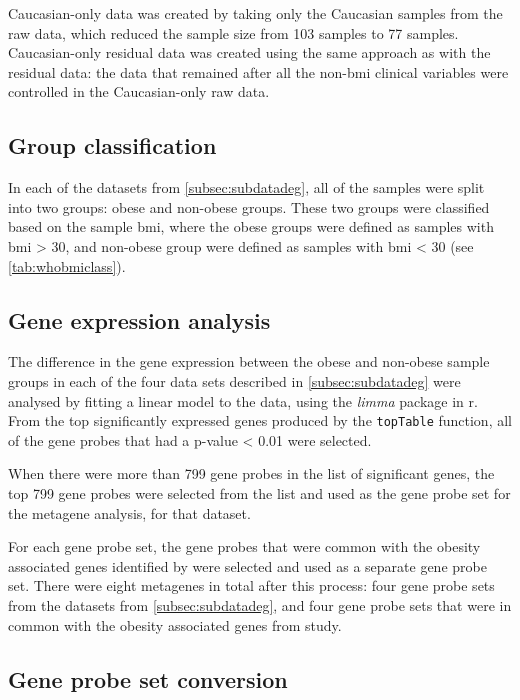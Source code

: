 Caucasian-only data was created by taking only the Caucasian samples from the raw data, which reduced the sample size from 103 samples to 77 samples.
Caucasian-only residual data was created using the same approach as with the residual data: the data that remained after all the non-\gls{bmi} clinical variables were controlled in the Caucasian-only raw data.

\subsection{Group classification}
\label{subsec:crdegclass}

In each of the datasets from \cref{subsec:subdatadeg}, all of the samples were split into two groups: obese and non-obese groups.
These two groups were classified based on the sample \gls{bmi}, where the obese groups were defined as samples with \gls{bmi}  \textgreater{} 30, and non-obese group were defined as samples with \gls{bmi}  \textless{} 30 (see \cref{tab:whobmiclass}).

\subsection{Gene expression analysis}
\label{subsec:crdeg}

The difference in the gene expression between the obese and non-obese sample groups in each of the four data sets described in \cref{subsec:subdatadeg} were analysed by fitting a linear model to the data, using the \textit{limma} package in \gls{r}.
From the top significantly expressed genes produced by the \texttt{topTable} function, all of the gene probes that had a p-value \textless{} 0.01 were selected.

When there were more than 799 gene probes in the list of significant genes, the top 799 gene probes were selected from the list and used as the gene probe set for the metagene analysis, for that dataset.

For each gene probe set, the gene probes that were common with the obesity associated genes identified by \citet{Creighton2012} were selected and used as a separate gene probe set.
There were eight metagenes in total after this process: four gene probe sets from the datasets from \cref{subsec:subdatadeg}, and four gene probe sets that were in common with the obesity associated genes from \citet{Creighton2012} study.

\subsection{Gene probe set conversion}
\label{subsec:gpconv}





